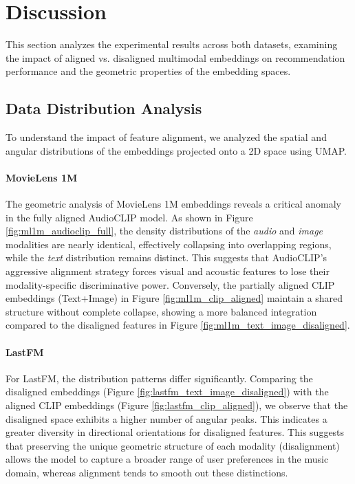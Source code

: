 \newpage

\section{Discussion}
This section analyzes the experimental results across both datasets, examining the impact of aligned vs. disaligned multimodal embeddings on recommendation performance and the geometric properties of the embedding spaces.

\subsection{Data Distribution Analysis}
To understand the impact of feature alignment, we analyzed the spatial and angular distributions of the embeddings projected onto a 2D space using UMAP.

\paragraph{MovieLens 1M}
The geometric analysis of MovieLens 1M embeddings reveals a critical anomaly in the fully aligned AudioCLIP model. As shown in Figure \ref{fig:ml1m_audioclip_full}, the density distributions of the \textit{audio} and \textit{image} modalities are nearly identical, effectively collapsing into overlapping regions, while the \textit{text} distribution remains distinct. This suggests that AudioCLIP's aggressive alignment strategy forces visual and acoustic features to lose their modality-specific discriminative power. Conversely, the partially aligned CLIP embeddings (Text+Image) in Figure \ref{fig:ml1m_clip_aligned} maintain a shared structure without complete collapse, showing a more balanced integration compared to the disaligned features in Figure \ref{fig:ml1m_text_image_disaligned}.

\paragraph{LastFM}
For LastFM, the distribution patterns differ significantly. Comparing the disaligned embeddings (Figure \ref{fig:lastfm_text_image_disaligned}) with the aligned CLIP embeddings (Figure \ref{fig:lastfm_clip_aligned}), we observe that the disaligned space exhibits a higher number of angular peaks. This indicates a greater diversity in directional orientations for disaligned features. This suggests that preserving the unique geometric structure of each modality (disalignment) allows the model to capture a broader range of user preferences in the music domain, whereas alignment tends to smooth out these distinctions.

